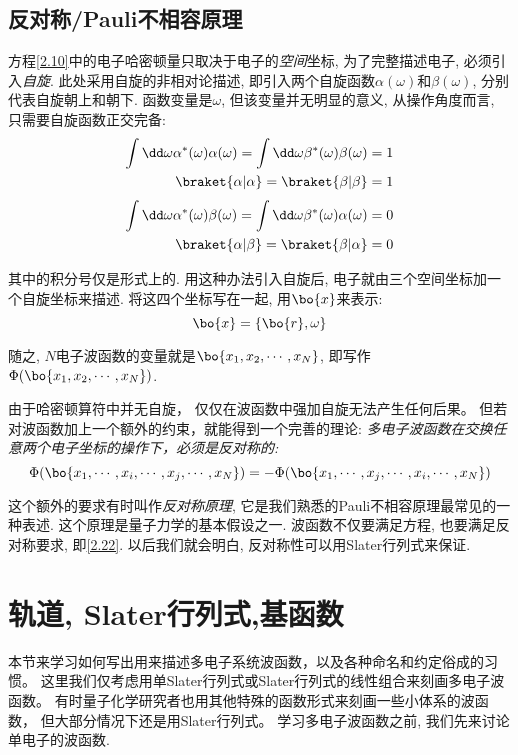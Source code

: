 \subsection{反对称/Pauli不相容原理}
\label{sec2.1.3}
方程\autoref{2.10}中的电子哈密顿量只取决于电子的\emph{空间}坐标, 
为了完整描述电子, 
必须引入\emph{自旋}. 
此处采用自旋的非相对论描述, 
即引入两个自旋函数$\alpha(\omega)$和$\beta(\omega)$, 
分别代表自旋朝上和朝下. 
函数变量是$\omega$, 
但该变量并无明显的意义, 
从操作角度而言, 
只需要自旋函数正交完备:
\begin{subequations}
	\begin{align}
\int\dd\omega\alpha^*(\omega)\alpha(\omega)=\int\dd\omega\beta^*(\omega)\beta(\omega)=1\\
\braket{\alpha|\alpha}=\braket{\beta|\beta}=1
	\end{align}
\end{subequations}
\begin{subequations}
	\begin{align}
	\int\dd\omega\alpha^*(\omega)\beta(\omega)=\int\dd\omega\beta^*(\omega)\alpha(\omega)=0\\
	\braket{\alpha|\beta}=\braket{\beta|\alpha}=0
	\end{align}
\end{subequations}
\label{2.20}

其中的积分号仅是形式上的. 
用这种办法引入自旋后, 
电子就由三个空间坐标加一个自旋坐标来描述. 
将这四个坐标写在一起,
用$\bo{x}$来表示:
 \begin{equation}
 \label{2.21}
 \bo{x}=\{\bo{r},\omega\}
 \end{equation}

 随之, $N$电子波函数的变量就是$ \bo{x_1,x_2,\cdots ,x_N} $, 即写作$\Phi(\bo{x_1,x_2,\cdots ,x_N})$.
 
由于哈密顿算符中并无自旋，
仅仅在波函数中强加自旋无法产生任何后果。
但若对波函数加上一个额外的约束，就能得到一个完善的理论: 
\emph{
	多电子波函数在交换任意两个电子坐标的操作下，必须是反对称的:
}
\begin{equation}
\label{2.22}
\Phi(\bo{x_1,\cdots,x_i,\cdots,x_j,\cdots ,x_N})=-\Phi(\bo{x_1,\cdots,x_j,\cdots,x_i,\cdots ,x_N})
\end{equation}

这个额外的要求有时叫作\emph{反对称原理}, 
它是我们熟悉的Pauli不相容原理最常见的一种表述. 
这个原理是量子力学的基本假设之一. 
波函数不仅要满足\sch 方程, 
也要满足反对称要求, 即\autoref{2.22}. 
以后我们就会明白, 反对称性可以用Slater行列式来保证.
 
\section{轨道, Slater行列式,基函数}
\label{sec2.2}
本节来学习如何写出用来描述多电子系统波函数，以及各种命名和约定俗成的习惯。
这里我们仅考虑用单Slater行列式或Slater行列式的线性组合来刻画多电子波函数。
有时量子化学研究者也用其他特殊的函数形式来刻画一些小体系的波函数，
但大部分情况下还是用Slater行列式。
学习多电子波函数之前, 我们先来讨论单电子的波函数.
 
